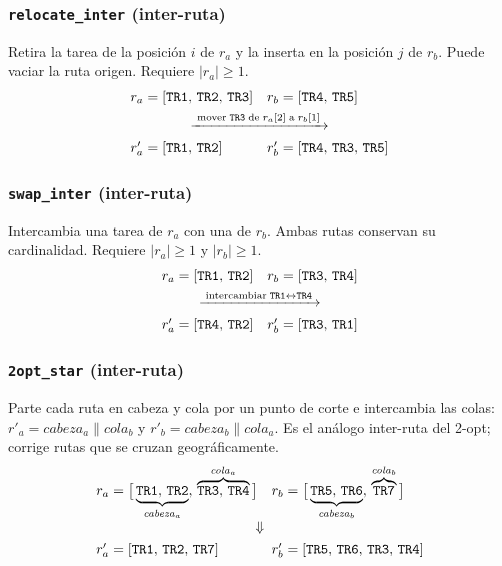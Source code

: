 \subsubsection{\texttt{relocate\_inter} (inter-ruta)}
Retira la tarea de la posición $i$ de $r_a$ y la inserta en la posición $j$
de $r_b$. Puede vaciar la ruta origen. Requiere $|r_a| \geq 1$.
\[
    \begin{array}{ll}
        r_a = [\mathtt{TR1},\,\mathtt{TR2},\,\mathtt{TR3}]
        & r_b = [\mathtt{TR4},\,\mathtt{TR5}] \\[4pt]
        \multicolumn{2}{c}{\xrightarrow{\;\text{mover}\;\mathtt{TR3}\;\text{de}\;r_a[2]\;\text{a}\;r_b[1]\;}} \\[4pt]
        r'_a = [\mathtt{TR1},\,\mathtt{TR2}]
        & r'_b = [\mathtt{TR4},\,\mathtt{TR3},\,\mathtt{TR5}]
    \end{array}
\]

\subsubsection{\texttt{swap\_inter} (inter-ruta)}
Intercambia una tarea de $r_a$ con una de $r_b$. Ambas rutas conservan su
cardinalidad. Requiere $|r_a| \geq 1$ y $|r_b| \geq 1$.
\[
    \begin{array}{ll}
        r_a = [\mathtt{TR1},\,\mathtt{TR2}]
        & r_b = [\mathtt{TR3},\,\mathtt{TR4}] \\[4pt]
        \multicolumn{2}{c}{\xrightarrow{\;\text{intercambiar}\;\mathtt{TR1}\leftrightarrow\mathtt{TR4}\;}} \\[4pt]
        r'_a = [\mathtt{TR4},\,\mathtt{TR2}]
        & r'_b = [\mathtt{TR3},\,\mathtt{TR1}]
    \end{array}
\]

\subsubsection{\texttt{2opt\_star} (inter-ruta)}
Parte cada ruta en cabeza y cola por un punto de corte e intercambia las
colas: $r'_a = \mathit{cabeza}_a \| \mathit{cola}_b$ y
$r'_b = \mathit{cabeza}_b \| \mathit{cola}_a$. Es el análogo inter-ruta del
2-opt; corrige rutas que se cruzan geográficamente.
\[
    \begin{array}{ll}
        r_a = \bigl[\,\underbrace{\mathtt{TR1},\,\mathtt{TR2}}_{\mathit{cabeza}_a},\,
                     \overbrace{\mathtt{TR3},\,\mathtt{TR4}}^{\mathit{cola}_a}\,\bigr]
        &
        r_b = \bigl[\,\underbrace{\mathtt{TR5},\,\mathtt{TR6}}_{\mathit{cabeza}_b},\,
                     \overbrace{\mathtt{TR7}}^{\mathit{cola}_b}\,\bigr] \\[10pt]
        \multicolumn{2}{c}{\Downarrow} \\[4pt]
        r'_a = [\mathtt{TR1},\,\mathtt{TR2},\,\mathtt{TR7}]
        &
        r'_b = [\mathtt{TR5},\,\mathtt{TR6},\,\mathtt{TR3},\,\mathtt{TR4}]
    \end{array}
\]

